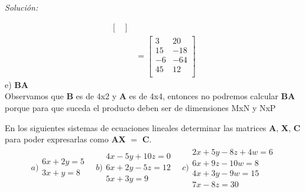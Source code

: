 \documentclass[12pt]{article}
\newenvironment{problem}[2][Problema]{\begin{trivlist}
\item[\hskip \labelsep {\bfseries #1}\hskip \labelsep {\bfseries #2.}]}{\end{trivlist}}
\newenvironment{sol}
    {\emph{Solución:}
    }
    {
    }
\begin{document}
\begin{sol}
\begin{align*}
\begin{bmatrix}
\end{bmatrix} \\
&=
\begin{bmatrix}
3 & 20 \\
15 & -18 \\
-6 & -64 \\
45 & 12 \\
\end{bmatrix}
\end{align*}
e) \textbf{BA} \\
Observamos que \textbf{B} es de 4x2 y \textbf{A} es de 4x4, entonces no podremos calcular \textbf{B}\textbf{A} porque para que suceda el producto deben ser de dimensiones MxN y NxP
\end{sol}

\pagebreak

\begin{problem}{II} 
En los siguientes sistemas de ecuaciones lineales determinar las matrices \textbf{A}, \textbf{X}, \textbf{C} para poder
expresarlas como \textbf{AX} $=$ \textbf{C}. \\
\begin{align*}
a) 
\begin{matrix}
6x+2y=5 \\
3x+y=8
\end{matrix}
\quad b)
\begin{matrix}
4x-5y+10z =0 \\
6x+2y-5z=12 \\
5x+3y = 9
\end{matrix}
\quad
c)\begin{matrix}
2x+5y-8z+4w = 6\\
6x + 9z -10w =8 \\
4x +3y -9w = 15 \\
7x - 8z =30
\end{matrix}
\end{align*}
\end{problem}
\end{document}
